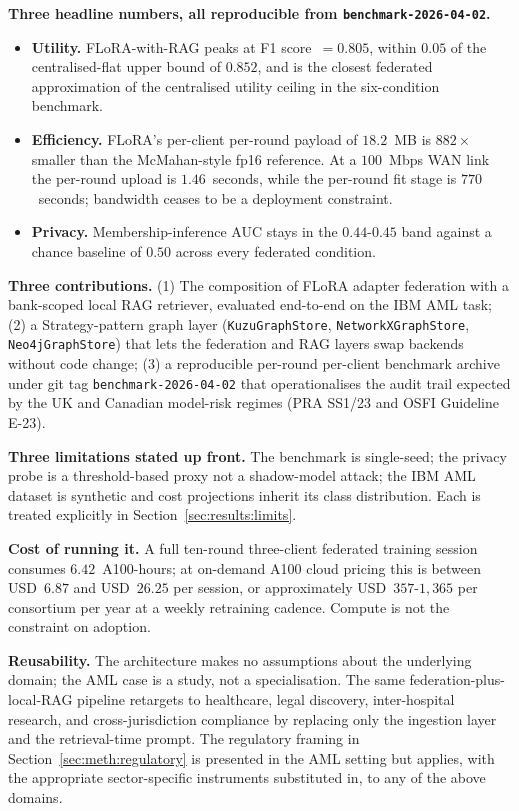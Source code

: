 \documentclass{report}
\begin{document}
\textbf{Three headline numbers, all reproducible from \texttt{benchmark-2026-04-02}.}
\begin{itemize}
    \setlength\itemsep{0em}
    \item \textbf{Utility.} FLoRA-with-RAG peaks at F1 score~$=0.805$, within $0.05$ of the centralised-flat upper bound of $0.852$, and is the closest federated approximation of the centralised utility ceiling in the six-condition benchmark.
    \item \textbf{Efficiency.} FLoRA's per-client per-round payload of $18.2$~MB is $882\times$ smaller than the McMahan-style fp16 reference. At a $100$~Mbps WAN link the per-round upload is $1.46$~seconds, while the per-round fit stage is $770$~seconds; bandwidth ceases to be a deployment constraint.
    \item \textbf{Privacy.} Membership-inference AUC stays in the $0.44$-$0.45$ band against a chance baseline of $0.50$ across every federated condition.
\end{itemize}

\textbf{Three contributions.} (1) The composition of FLoRA adapter federation with a bank-scoped local RAG retriever, evaluated end-to-end on the IBM AML task; (2) a Strategy-pattern graph layer (\texttt{KuzuGraphStore}, \texttt{NetworkXGraphStore}, \texttt{Neo4jGraphStore}) that lets the federation and RAG layers swap backends without code change; (3) a reproducible per-round per-client benchmark archive under git tag \texttt{benchmark-2026-04-02} that operationalises the audit trail expected by the UK and Canadian model-risk regimes (PRA SS1/23 and OSFI Guideline E-23).

\textbf{Three limitations stated up front.} The benchmark is single-seed; the privacy probe is a threshold-based proxy not a shadow-model attack; the IBM AML dataset is synthetic and cost projections inherit its class distribution. Each is treated explicitly in Section~\ref{sec:results:limits}.

\textbf{Cost of running it.} A full ten-round three-client federated training session consumes $6.42$~A100-hours; at on-demand A100 cloud pricing this is between USD~$6.87$ and USD~$26.25$ per session, or approximately USD~$357$-$1{,}365$ per consortium per year at a weekly retraining cadence. Compute is not the constraint on adoption.

\textbf{Reusability.} The architecture makes no assumptions about the underlying domain; the AML case is a study, not a specialisation. The same federation-plus-local-RAG pipeline retargets to healthcare, legal discovery, inter-hospital research, and cross-jurisdiction compliance by replacing only the ingestion layer and the retrieval-time prompt. The regulatory framing in Section~\ref{sec:meth:regulatory} is presented in the AML setting but applies, with the appropriate sector-specific instruments substituted in, to any of the above domains.
\end{document}
